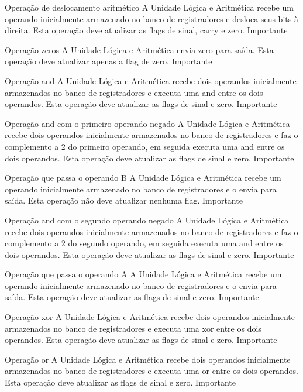 \documentclass{report}
\begin{document}
\begin{functional}
       \requirement
      {Operação de deslocamento aritmético}
      {A Unidade Lógica e Aritmética recebe um operando inicialmente armazenado no banco de registradores e desloca seus bits à direita. Esta operação deve atualizar as flags de sinal, carry e zero.}
      {Importante}
      
       \requirement
      {Operação zeros}
      {A Unidade Lógica e Aritmética envia zero para saída. Esta operação deve atualizar apenas a flag de zero.}
      {Importante}
      
      \requirement
      {Operação and}
      {A Unidade Lógica e Aritmética recebe dois operandos inicialmente armazenados no banco de registradores e executa uma and entre os dois operandos. Esta operação deve atualizar as flags de sinal e zero.}
      {Importante}
      
      \requirement
      {Operação and com o primeiro operando negado}
      {A Unidade Lógica e Aritmética recebe dois operandos inicialmente armazenados no banco de registradores e faz o complemento a 2 do primeiro operando, em seguida executa uma and entre os dois operandos. Esta operação deve atualizar as flags de sinal e zero.}
      {Importante}
      
      \requirement
      {Operação que passa o operando B}
      {A Unidade Lógica e Aritmética recebe um operando inicialmente armazenado no banco de registradores e o envia para saída. Esta operação não deve atualizar nenhuma flag.}
      {Importante}
      
      \requirement
      {Operação and com o segundo operando negado}
      {A Unidade Lógica e Aritmética recebe dois operandos inicialmente armazenados no banco de registradores e faz o complemento a 2 do segundo operando, em seguida executa uma and entre os dois operandos. Esta operação deve atualizar as flags de sinal e zero.}
      {Importante}
      
      \requirement
      {Operação que passa o operando A}
      {A Unidade Lógica e Aritmética recebe um operando inicialmente armazenado no banco de registradores e o envia para saída. Esta operação deve atualizar as flags de sinal e zero.}
      {Importante}
      
      \requirement
      {Operação xor}
      {A Unidade Lógica e Aritmética recebe dois operandos inicialmente armazenados no banco de registradores e executa uma xor entre os dois operandos. Esta operação deve atualizar as flags de sinal e zero.}
      {Importante}
      
      \requirement
      {Operação or}
      {A Unidade Lógica e Aritmética recebe dois operandos inicialmente armazenados no banco de registradores e executa uma or entre os dois operandos. Esta operação deve atualizar as flags de sinal e zero.}
      {Importante}
      

\end{functional}
\end{document}
